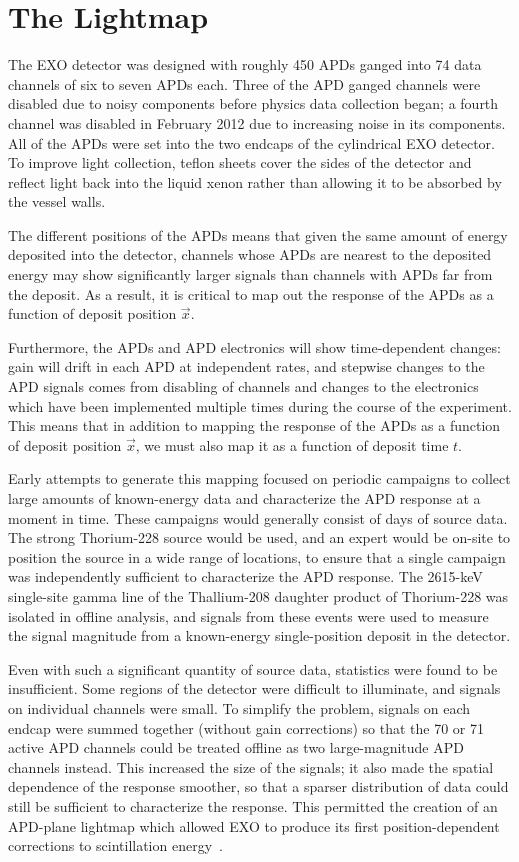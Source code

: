\renewcommand{\thechapter}{6}
\chapter{The Lightmap}
\label{ch:Lightmap}

The EXO detector was designed with roughly 450 APDs ganged into 74 data channels of six to seven APDs each. Three of the APD ganged channels were disabled due to noisy components before physics data collection began; a fourth channel was disabled in February 2012 due to increasing noise in its components.  All of the APDs were set into the two endcaps of the cylindrical EXO detector.  To improve light collection, teflon sheets cover the sides of the detector and reflect light back into the liquid xenon rather than allowing it to be absorbed by the vessel walls.

The different positions of the APDs means that given the same amount of energy deposited into the detector, channels whose APDs are nearest to the deposited energy may show significantly larger signals than channels with APDs far from the deposit.   As a result, it is critical to map out the response of the APDs as a function of deposit position $\vec{x}$.

Furthermore, the APDs and APD electronics will show time-dependent changes: gain will drift in each APD at independent rates, and stepwise changes to the APD signals comes from disabling of channels and changes to the electronics which have been implemented multiple times during the course of the experiment.  This means that in addition to mapping the response of the APDs as a function of deposit position $\vec{x}$, we must also map it as a function of deposit time $t$.

Early attempts to generate this mapping focused on periodic campaigns to collect large amounts of known-energy data and characterize the APD response at a moment in time.  These campaigns would generally consist of days of source data.  The strong Thorium-228 source would be used, and an expert would be on-site to position the source in a wide range of locations, to ensure that a single campaign was independently sufficient to characterize the APD response.  The 2615-keV single-site gamma line of the Thallium-208 daughter product of Thorium-228 was isolated in offline analysis, and signals from these events were used to measure the signal magnitude from a known-energy single-position deposit in the detector.

Even with such a significant quantity of source data, statistics were found to be insufficient.  Some regions of the detector were difficult to illuminate, and signals on individual channels were small.  To simplify the problem, signals on each endcap were summed together (without gain corrections) so that the 70 or 71 active APD channels could be treated offline as two large-magnitude APD channels instead.  This increased the size of the signals; it also made the spatial dependence of the response smoother, so that a sparser distribution of data could still be sufficient to characterize the response.  This permitted the creation of an APD-plane lightmap which allowed EXO to produce its first position-dependent corrections to scintillation energy~\cite{ThesisSteve}.

